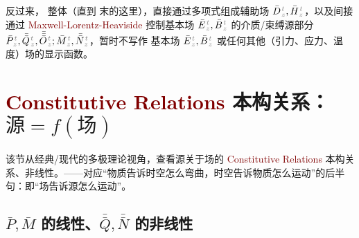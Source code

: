 反过来， 整体（直到  末的这里），直接通过多项式组成辅助场 $\bar{D}^{\;\!\mathcolor{gray}{t}}_{\;\!\mathcolor{gray}{z}}, \bar{H}^{\;\!\mathcolor{gray}{t}}_{\;\!\mathcolor{gray}{z}}$，以及间接通过 \textcolor{Maroon}{Maxwell-Lorentz-Heaviside}  控制基本场 $\bar{E}^{\;\!\mathcolor{gray}{t}}_{\;\!\mathcolor{gray}{z}}, \bar{B}^{\;\!\mathcolor{gray}{t}}_{\;\!\mathcolor{gray}{z}}$ 的介质/束缚源部分 $\bar{P}^{\;\!\mathcolor{gray}{t}}_{\;\!\mathcolor{gray}{z}},\bar{\bar{Q}}^{\;\!\mathcolor{gray}{t}}_{\;\!\mathcolor{gray}{z}},\bar{\bar{\bar{O}}}^{\;\!\mathcolor{gray}{t}}_{\;\!\mathcolor{gray}{z}} ; \bar{M}^{\;\!\mathcolor{gray}{t}}_{\;\!\mathcolor{gray}{z}}, \bar{\bar{N}}^{\;\!\mathcolor{gray}{t}}_{\;\!\mathcolor{gray}{z}}$，暂时不写作 基本场 $\bar{E}^{\;\!\mathcolor{gray}{t}}_{\;\!\mathcolor{gray}{z}}, \bar{B}^{\;\!\mathcolor{gray}{t}}_{\;\!\mathcolor{gray}{z}}$ 或任何其他（引力、应力、温度）场的显示函数。

\section{\textcolor{Maroon}{Constitutive Relations} 本构关系：$\text{源} = f(\text{场})$}\label{sec:constitutive}

该节从经典/现代的多极理论视角，查看源关于场的 \textcolor{Maroon}{Constitutive Relations} 本构关系、非线性。——对应“物质告诉时空怎么弯曲，时空告诉物质怎么运动”的后半句：即“场告诉源怎么运动”。

\subsection{$\bar{P},\bar{M}$ 的线性、$\bar{\bar{Q}},\bar{\bar{N}}$ 的非线性}\label{ssec:PMQN-nonlinear}

